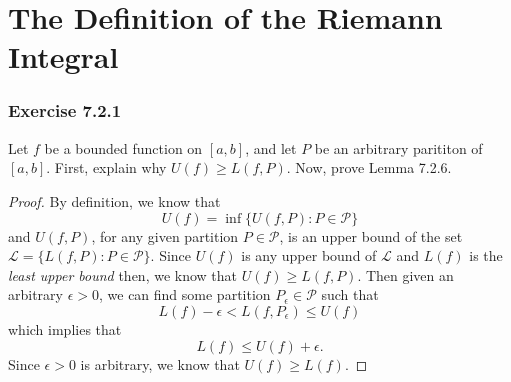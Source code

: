 \section{The Definition of the Riemann Integral}

\subsubsection{Exercise 7.2.1} Let \( f  \) be a bounded function on \( [a,b]  \), and let \( P  \) be an arbitrary parititon of \(  [a,b]  \). First, explain why \( U(f) \geq L(f,P)  \). Now, prove Lemma 7.2.6.
\begin{proof}
By definition, we know that 
\[  U(f) = \inf \{ U(f,P) : P \in \mathcal{P} \}  \] and \( U(f,P)   \), for any given partition \( P \in \mathcal{P} \), is an upper bound of the set \( \mathcal {L} = \{ L(f,P) 
: P \in \mathcal{P}\}  \). Since \( U(f)  \) is any upper bound of \( \mathcal{L} \) and \( L(f)  \) is the \textit{least upper bound} then, we know that \( U(f) \geq L(f,P) \). Then given an arbitrary \( \epsilon > 0  \), we can find some partition \( P_{\epsilon } \in \mathcal{P} \) such that 
\[  L(f) - \epsilon < L(f, P_{\epsilon }) \leq U(f)  \]
which implies that 
\[  L(f) \leq U(f) + \epsilon. \]
Since \( \epsilon > 0  \) is arbitrary, we know that \( U(f) \geq L(f) \).
\end{proof}



